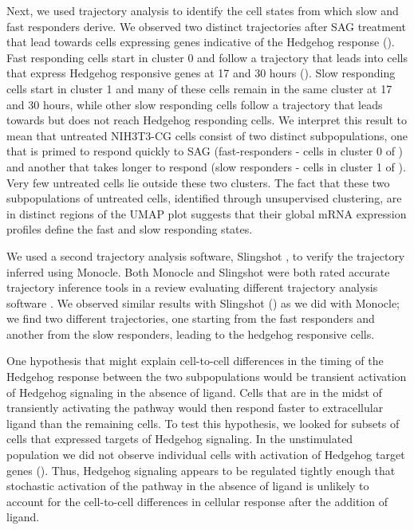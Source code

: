 Next, we used trajectory analysis \cite{Qiu2017-uz,Trapnell2014-ho} to identify the cell states from which slow and fast responders derive. We observed two distinct trajectories after SAG treatment that lead towards cells expressing genes indicative of the Hedgehog response (). Fast responding cells start in cluster 0 and follow a trajectory that leads into cells that express Hedgehog responsive genes at 17 and 30 hours (). Slow responding cells start in cluster 1 and many of these cells remain in the same cluster at 17 and 30 hours, while other slow responding cells follow a trajectory that leads towards but does not reach Hedgehog responding cells. We interpret this result to mean that untreated NIH3T3-CG cells consist of two distinct subpopulations, one that is primed to respond quickly to SAG (fast-responders - cells in cluster 0 of ) and another that takes longer to respond (slow responders - cells in cluster 1 of ). Very few untreated cells lie outside these two clusters. The fact that these two subpopulations of untreated cells, identified through unsupervised clustering, are in distinct regions of the UMAP plot suggests that their global mRNA expression profiles define the fast and slow responding states.

We used a second trajectory analysis software, Slingshot \cite{Street2018-ak}, to verify the trajectory inferred using Monocle. Both Monocle and Slingshot were both rated accurate trajectory inference tools in a review evaluating different trajectory analysis software \cite{Saelens2019-fq}. We observed similar results with Slingshot () as we did with Monocle; we find two different trajectories, one starting from the fast responders and another from the slow responders, leading to the hedgehog responsive cells.

One hypothesis that might explain cell-to-cell differences in the timing of the Hedgehog response between the two subpopulations would be transient activation of Hedgehog signaling in the absence of ligand. Cells that are in the midst of transiently activating the pathway would then respond faster to extracellular ligand than the remaining cells. To test this hypothesis, we looked for subsets of cells that expressed targets of Hedgehog signaling. In the unstimulated population we did not observe individual cells with activation of Hedgehog target genes (). Thus, Hedgehog signaling appears to be regulated tightly enough that stochastic activation of the pathway in the absence of ligand is unlikely to account for the cell-to-cell differences in cellular response after the addition of ligand.

